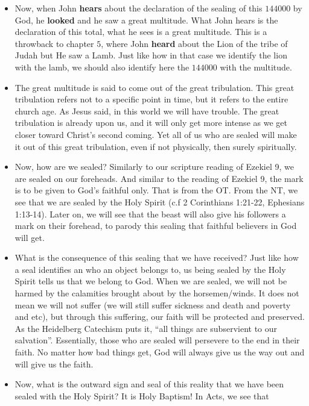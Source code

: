 \begin{itemize}
{represent the entirety of the redeemed church, then $144 \times 1000$
represent a great multitude.}
\item{Now, when John \textbf{hears} about the declaration of the sealing of
this $144000$ by God, he \textbf{looked} and he saw a great multitude.  What
John hears is the declaration of this total, what he sees is a great
multitude.  This is a throwback to chapter $5$, where John \textbf{heard}
about the Lion of the tribe of Judah but He saw a Lamb.  Just like how in
that case we identify the lion with the lamb, we should also identify here
the $144000$ with the multitude.}
\item{The great multitude is said to come out of the great tribulation.  This
great tribulation refers not to a specific point in time, but it refers to
the entire church age.  As Jesus said, in this world we will have trouble.
The great tribulation is already upon us, and it will only get more intense
as we get closer toward Christ's second coming.  Yet all of us who are sealed
will make it out of this great tribulation, even if not physically, then
surely spiritually.}
\item{Now, how are we sealed?  Similarly to our scripture reading of Ezekiel
9, we are sealed on our foreheads.  And similar to the reading of Ezekiel 9,
the mark is to be given to God's faithful only.  That is from the OT.  From
the NT, we see that we are sealed by the Holy Spirit (c.f 2 Corinthians
1:21-22, Ephesians 1:13-14).  Later on, we will see that the beast will also
give his followers a mark on their forehead, to parody this sealing that
faithful believers in God will get.}
\item{What is the consequence of this sealing that we have received?  Just
like how a seal identifies an who an object belongs to, us being sealed by
the Holy Spirit tells us that we belong to God.  When we are sealed, we will
not be harmed by the calamities brought about by the horsemen/winds.  It does
not mean we will not suffer (we will still suffer sickness and death and
poverty and etc), but through this suffering, our faith will be protected and
preserved.  As the Heidelberg Catechism puts it, ``all things are subservient
to our salvation''.  Essentially, those who are sealed will persevere to the
end in their faith.  No matter how bad things get, God will always give us
the way out and will give us the faith.  }
\item{Now, what is the outward sign and seal of this reality that we have
been sealed with the Holy Spirit?  It is Holy Baptism!  In Acts, we see that
}
\end{itemize}
